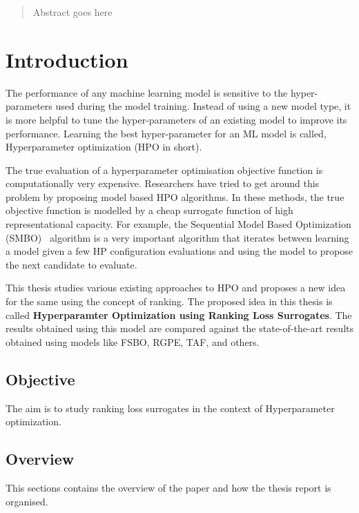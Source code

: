 \documentclass[12pt, twoside, ngerman]{report}
\begin{document}
\newpage
{}
\begin{abstract}

Abstract goes here

\end{abstract}

\newpage

\tableofcontents
\newpage
\newpage


\chapter{Introduction}

The performance of any machine learning model is sensitive to the hyper-parameters used during the model training. 
Instead of using a new model type, it is more helpful to tune the hyper-parameters of an existing model to improve its performance.
Learning the best hyper-parameter for an ML model is called, Hyperparameter optimization (HPO in short).

The true evaluation of a hyperparameter optimisation objective function is computationally very expensive. 
Researchers have tried to get around this problem by proposing model based HPO algorithms.
In these methods,  the true objective function is modelled by a cheap surrogate function of high representational capacity.
For example,  the Sequential Model Based Optimization (SMBO)~\cite{NIPS2011_86e8f7ab} algorithm is a very important algorithm that iterates between learning a model given a few HP configuration evaluations and using the model to propose the next candidate to evaluate.

This thesis studies various existing approaches to HPO and proposes a new idea for the same using the concept of ranking.
The proposed idea in this thesis is called \textbf{Hyperparamter Optimization using Ranking Loss Surrogates}. 
The results obtained using this model are compared against the state-of-the-art results obtained using models like FSBO,  RGPE,  TAF, and others. 

\label{ProblemOverviewlabel}
\section{Objective}
The aim is to study ranking loss surrogates in the context of Hyperparameter optimization.

\section{Overview}
This sections contains the overview of the paper and how the thesis report is organised.
\end{document}

